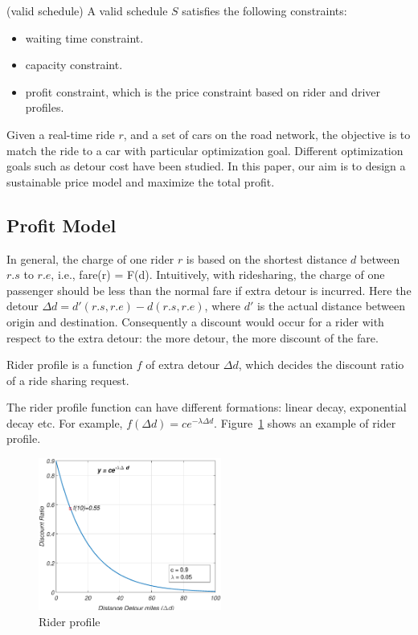 \begin{definition}
(valid schedule) A valid schedule $S$ satisfies the following constraints:
\begin{itemize}
	\item waiting time constraint.
	\item capacity constraint.
	\item profit constraint, which is the price constraint based on rider and driver profiles.
\end{itemize}
\end{definition}

Given a real-time ride $r$, and a set of cars on the road network, the objective is to match the ride to a car with particular optimization goal. Different optimization goals such as detour cost have been studied. In this paper, our aim is to design a sustainable price model and maximize the total profit. 

\subsection{Profit Model}
In general, the charge of one rider $r$ is based on the shortest distance $d$ between $r.s$ to $r.e$, i.e., fare(r) = F(d). Intuitively, with ridesharing, the charge of one passenger should be less than the normal fare if extra detour is incurred. Here the detour $\Delta d=d'(r.s, r.e)-d(r.s, r.e)$, where $d'$ is the actual distance between origin and destination. Consequently a discount would occur for a rider with respect to the extra detour: the more detour, the more discount of the fare.

\begin{definition}
	Rider profile is a function $f$ of extra detour $\Delta d$, which decides the discount ratio of a ride sharing request.
\end{definition}
The rider profile function can have different formations: linear decay, exponential decay etc. For example, $f(\Delta d)=c e^{-\lambda \Delta d}$.
Figure~\ref{fig:rider_profile} shows an example of rider profile.

\begin{figure}[!ht]
	\centering
	\includegraphics[width = 60mm]{fig/rider.eps}
	\vspace{-0mm}\caption{Rider profile} \vspace{-2mm} \label{fig:rider_profile}
\end{figure}\vspace{-0mm}

